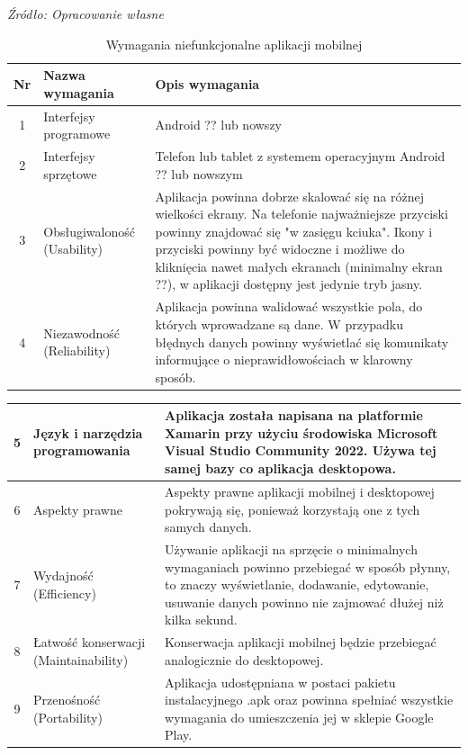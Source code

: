 \documentclass[12pt,oneside]{report}
\begin{document}
\begin{table}[H]
	\caption{Wymagania niefunkcjonalne aplikacji mobilnej }
	\textit{Źródło: Opracowanie własne}
	\label{WymaganiaNFmobilne}
	\centering
	\begin{tabular}{|c|p{6cm}|p{8cm}|}
		\hline
		Nr & Nazwa wymagania & Opis wymagania\\
		\hline
		1& Interfejsy programowe& Android ?? lub nowszy \\		
		\hline
		2& Interfejsy sprzętowe& Telefon lub tablet z systemem operacyjnym Android ?? lub nowszym \\	
		\hline	
		3& Obsługiwaloność (Usability)& 
		Aplikacja powinna dobrze skalować się na różnej wielkości ekrany. Na telefonie najważniejsze przyciski powinny znajdować się "w zasięgu kciuka". Ikony i przyciski powinny być widoczne i możliwe do kliknięcia nawet małych ekranach (minimalny ekran ??), w aplikacji dostępny jest jedynie tryb jasny.\\		
		\hline
		4& Niezawodność (Reliability)&Aplikacja powinna walidować wszystkie pola, do których wprowadzane są dane. W przypadku błędnych danych powinny wyświetlać się komunikaty informujące o nieprawidłowościach w klarowny sposób. \\	
		\hline
						\end{tabular}
	\end{table}

\begin{table}[H]
\begin{tabular}{|c|p{6cm}|p{8cm}|}
\hline
		5& Język i narzędzia programowania& Aplikacja została napisana na platformie Xamarin przy użyciu środowiska  Microsoft Visual Studio Community 2022. Używa tej samej bazy co aplikacja desktopowa. \\	
		\hline
		6& Aspekty prawne& Aspekty prawne aplikacji mobilnej i desktopowej pokrywają się, ponieważ korzystają one z tych samych danych.\\	
		\hline
		7& Wydajność (Efficiency)&
		Używanie aplikacji na sprzęcie o minimalnych wymaganiach powinno przebiegać w sposób płynny, to znaczy wyświetlanie, dodawanie, edytowanie, usuwanie danych powinno nie zajmować dłużej niż kilka sekund. \\	
		\hline	
		8& Łatwość konserwacji (Maintainability)&
		Konserwacja aplikacji mobilnej będzie przebiegać analogicznie do desktopowej. \\	
		\hline
		9& Przenośność (Portability)&Aplikacja udostępniana w postaci pakietu instalacyjnego .apk oraz powinna spełniać wszystkie wymagania do umieszczenia jej w sklepie Google Play. \\
		\hline
	\end{tabular}
\end{table}
\end{document}
